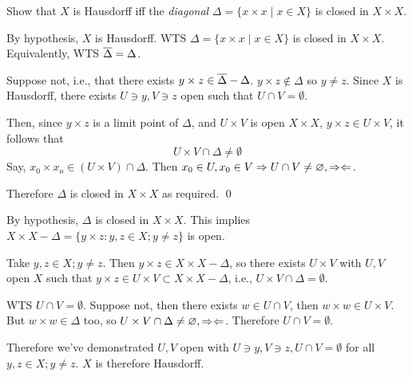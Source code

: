 \documentclass[a4paper, 12pt]{article}
\begin{document}
\begin{problem} 
    Show that $X$ is Hausdorff iff the \textit{diagonal} $\Delta = \{x \times x \mid x \in X\}$ is closed in $X \times X$.
\end{problem}
\begin{solution}
    \pffwd By hypothesis, $X$ is Hausdorff. WTS $\Delta = \{x \times x \mid x \in X\}$ is closed in $X \times X$. Equivalently, WTS $\overline{\Delta} = \Delta$.

    Suppose not, i.e., that there exists $y \times z \in \overline{\Delta} - \Delta$. $y \times z \not \in \Delta$ so $y \neq z$. Since $X$ is Hausdorff, there exists $U \ni y, V \ni z$ open such that $U \cap V = \emptyset$.

    Then, since $y \times z$ is a limit point of $\Delta$, and $U \times V$ is open $X \times X$, $y \times z \in U \times V$, it follows that \begin{equation*}
    U \times V \cap \Delta \neq \emptyset
    \end{equation*}
    Say, $x_0 \times x_o \in (U \times V) \cap \Delta$. Then $x_0 \in U, x_0 \in V \Rightarrow U \cap V \neq \varnothing, \Rightarrow\Leftarrow$.

    Therefore $\Delta$ is closed in $X \times X$ as required. \qed

    \pfbwd By hypothesis, $\Delta$ is closed in $X \times X$. This implies $X \times X - \Delta = \{y \times z : y, z \in X;y \neq z\}$ is open.

    Take $y, z \in X;y \neq z $. Then $y \times z \in X \times X - \Delta$, so there exists $U \times V$ with $U, V$ open $X$ such that $y \times z \in U \times V \subset X \times X - \Delta$, i.e., $U \times V \cap \Delta = \emptyset$.

    WTS $U \cap V = \emptyset$. Suppose not, then there exists $w \in U \cap V$, then $w \times w \in U \times V$. But $w \times w \in \Delta$ too, so $U \times V \cap \Delta \neq \varnothing, \Rightarrow\Leftarrow$. Therefore $U \cap V = \emptyset$.

    Therefore we've demonstrated $U, V$ open with $U \ni y, V \ni z, U \cap V = \emptyset$ for all $y, z \in X; y \neq z$. $X$ is therefore Hausdorff.
\end{solution}
\end{document}
